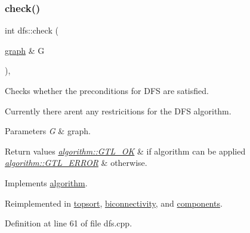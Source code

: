 \subsubsection{\texorpdfstring{check()}{check()}}
{\footnotesize\ttfamily int dfs\+::check (\begin{DoxyParamCaption}\item[{\mbox{\hyperlink{classgraph}{graph}} \&}]{G }\end{DoxyParamCaption})\hspace{0.3cm}{\ttfamily [virtual]}, {\ttfamily [inherited]}}



Checks whether the preconditions for D\+FS are satisfied. 

Currently there aren\textquotesingle{}t any restricitions for the D\+FS algorithm.


\begin{DoxyParams}{Parameters}
{\em G} & graph. \\
\hline
\end{DoxyParams}

\begin{DoxyRetVals}{Return values}
{\em \mbox{\hyperlink{classalgorithm_af1a0078e153aa99c24f9bdf0d97f6710a5114c20e4a96a76b5de9f28bf15e282b}{algorithm\+::\+G\+T\+L\+\_\+\+OK}}} & if algorithm can be applied \\
\hline
{\em \mbox{\hyperlink{classalgorithm_af1a0078e153aa99c24f9bdf0d97f6710a6fcf574690bbd6cf710837a169510dd7}{algorithm\+::\+G\+T\+L\+\_\+\+E\+R\+R\+OR}}} & otherwise. \\
\hline
\end{DoxyRetVals}


Implements \mbox{\hyperlink{classalgorithm_a76361fb03ad1cf643affc51821e43bed}{algorithm}}.



Reimplemented in \mbox{\hyperlink{classtopsort_a777a9a68c4081d22e7b698ed3c515343}{topsort}}, \mbox{\hyperlink{classbiconnectivity_a65e0e821f5e9ce8d210648d462fd2cfa}{biconnectivity}}, and \mbox{\hyperlink{classcomponents_aeeda901d02c65d6c31c8b6148540d7c1}{components}}.



Definition at line 61 of file dfs.\+cpp.


